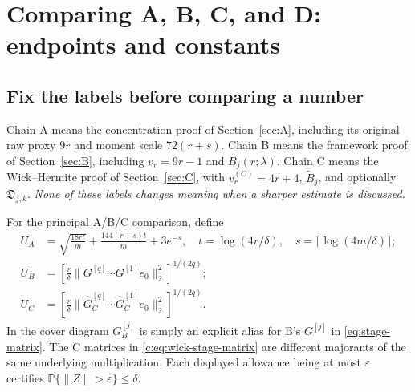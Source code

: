 \documentclass[11pt]{article}
\numberwithin{equation}{section}
\theoremstyle{definition}\newtheorem{definition}[theorem]{Definition}
\theoremstyle{remark}\newtheorem{remark}[theorem]{Remark}
\begin{document}
\section{Comparing A, B, C, and D: endpoints and constants}\label{sec:comparison}
\subsection{Fix the labels before comparing a number}
Chain A means the concentration proof of Section~\ref{sec:A}, including its
original raw proxy $9r$ and moment scale $72(r+s)$. Chain B means the framework
proof of Section~\ref{sec:B}, including $v_r=9r-1$ and $B_j(r;\lambda)$.
Chain C means the Wick--Hermite proof of Section~\ref{sec:C}, with
$v_r^{(C)}=4r+4$, $\widetilde B_j$, and optionally $\mathfrak D_{j,k}$.
\emph{None of these labels changes meaning when a sharper estimate is discussed.}

For the principal A/B/C comparison, define
\begin{align}
 U_A&=\sqrt{\frac{18rt}{m}}+\frac{144(r+s)t}{m}+3e^{-s},
 \quad t=\log(4r/\delta),\quad s=\lceil\log(4m/\delta)\rceil;
 \label{eq:UA}\\
 U_B&=\left[\frac r\delta\|G^{[q]}\cdots G^{[1]}e_0\|_2^2\right]^{1/(2q)};
 \label{eq:UBdynamic}\\
 U_C&=\left[\frac r\delta\|\widehat G_C^{[q]}\cdots\widehat G_C^{[1]}e_0\|_2^2\right]^{1/(2q)}.
 \label{eq:UCdynamic}
\end{align}
In the cover diagram $G_B^{[j]}$ is simply an explicit alias for B's
$G^{[j]}$ in \eqref{eq:stage-matrix}. The C matrices in \eqref{c:eq:wick-stage-matrix}
are different majorants of the same underlying multiplication. Each displayed
allowance being at most $\varepsilon$ certifies $\mathbb P\{\|Z\|>\varepsilon\}\le\delta$.
\end{document}
